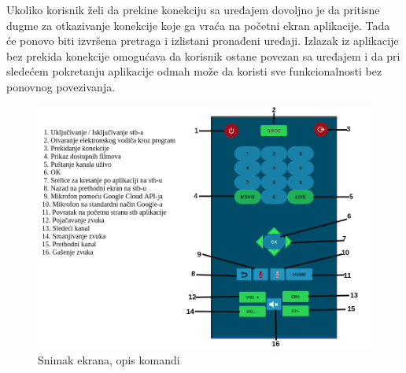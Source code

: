 \documentclass[implementacija.tex]{subfiles}
\begin{document}



Ukoliko korisnik želi da prekine konekciju sa uređajem dovoljno je da pritisne dugme za otkazivanje konekcije koje ga vraća na početni ekran aplikacije. Tada će ponovo biti izvršena pretraga i izlistani pronađeni uređaji. Izlazak iz aplikacije bez prekida konekcije omogućava da korisnik ostane povezan sa uređajem i da pri sledećem pokretanju aplikacije odmah može da koristi sve funkcionalnosti bez ponovnog povezivanja.

\begin{figure}[h!]
  \centering
  \includegraphics[width=\textwidth]{Implementacija/snimci_ekrana/komande_sa_opisom.png}
  \caption{Snimak ekrana, opis komandi}
   \label{fig:opis_komandi}
\end{figure}
\end{document}
